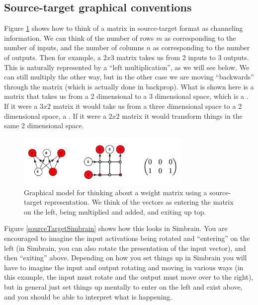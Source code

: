 \subsection{Source-target graphical conventions}

Figure \ref{sourceTargetConvention} shows how to think of a matrix in source-target format as channeling information.  We can think of the number of rows $m$ as corresponding to the number of inputs, and the number of columns $n$ as corresponding to the number of outputs.  Then for example, a $2x3$ matrix takes us from 2 inputs to 3 outputs. This is naturally represented by a ``left multiplication'', as we will see below. We can still multiply the other way, but in the other case we are moving ``backwards'' through the matrix (which is actually done in backprop).  What is shown here is a matrix that takes us from a 2 dimensional to a 3 dimensional space, which is a .  If it were a $3x2$ matrix it would take us from a three dimensional space to a 2 dimensional space, a . If it were a $2x2$ matrix it would transform things in the same 2 dimensional space.

\begin{figure}[h]
\centering
\includegraphics[width=0.75\textwidth]{images/sourceTarget.png}
\caption[Jeff Yoshimi.]{Graphical model for thinking about a weight matrix using a source-target representation. We think of the vectors as entering the matrix on the left, being multiplied and added, and exiting up top.}
\label{sourceTargetConvention}
\end{figure}

Figure \ref{sourceTargetSimbrain} shows how this looks in Simbrain. You are encouraged to imagine  the input activations being rotated and ``entering'' on the left (in Simbrain, you can also rotate the presentation of the input vector), and then ``exiting'' above.  Depending on how you set things up in Simbrain you will have to imagine the input and output rotating and moving in various ways (in this example, the input must rotate and the output must move over to the right), but in general just set things up mentally to enter on the left and exist above, and you should be able to interpret what is happening.

